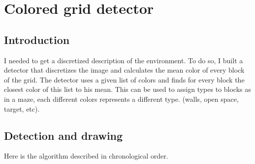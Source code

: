 \section{Colored grid detector}
\label{sec:cgd}

\subsection{Introduction}
\label{sec:cgd:intro}
I needed to get a discretized description of the environment. To do so, 
I built a detector that discretizes the image and calculates the mean 
color of every block of the grid. The detector uses a given list of 
colors and finds for every block the closest color of this list to his 
mean. This can be used to assign types to blocks as in a maze, each 
different colors represents a different type. (walls, open space, 
target, etc).

\subsection{Detection and drawing}
\label{sec:cgd:algo}
Here is the algorithm described in chronological order.


